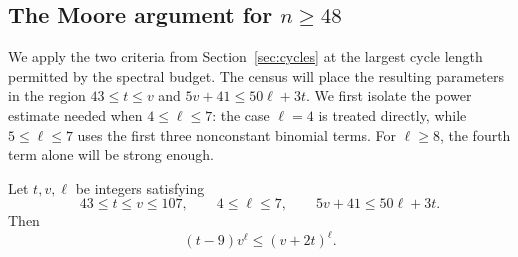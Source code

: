 \subsection{The Moore argument for \texorpdfstring{\(n\ge48\)}{n >= 48}}

We apply the two criteria from Section~\ref{sec:cycles} at the largest cycle
length permitted by the spectral budget.  The census will place the resulting
parameters in the region
\(43\le t\le v\) and \(5v+41\le50\ell+3t\).  We first isolate the power
estimate needed when \(4\le\ell\le7\): the case \(\ell=4\) is treated
directly, while \(5\le\ell\le7\) uses the first three nonconstant binomial
terms.  For \(\ell\ge8\), the fourth term alone will be strong enough.

\begin{lemma}\label{lem:small-exponent-power}
Let \(t,v,\ell\) be integers satisfying
\[
  43\le t\le v\le107,
  \qquad 4\le\ell\le7,
  \qquad 5v+41\le50\ell+3t.
\]
Then
\begin{equation}\label{eq:small-exponent-power}
 (t-9)v^\ell\le(v+2t)^\ell.
\end{equation}
\end{lemma}

